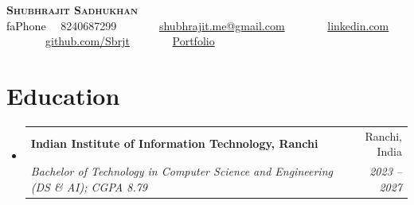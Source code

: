 \documentclass[letterpaper,11pt]{article}
\makeatletter
\newcommand{\resumeSubheading}[4]{
  \vspace{-2pt}\item
    \begin{tabular*}{0.97\textwidth}[t]{l@{\extracolsep{\fill}}r}
      \textbf{#1} & #2 \\
      \textit{\small#3} & \textit{\small #4} \\
    \end{tabular*}\vspace{-7pt}
}
\newcommand{\resumeSubHeadingListStart}{\begin{itemize}[leftmargin=0.15in, label={}]}
\newcommand{\resumeSubHeadingListEnd}{\end{itemize}}
\newcommand{\seticon}[1]{\textcolor{Black}{\csname #1\endcsname}}
\makeatother
\begin{document}

\begin{center}
    \textbf{\Huge \scshape Shubhrajit Sadhukhan} \\ \vspace{8pt}
    \footnotesize  \seticon{faPhone} \ \ 8240687299 \ \ \ \ \ \faEnvelope \ \  \href{mailto:shubhrajit.me@gmail.com}{shubhrajit.me@gmail.com} \ \ \ \ \ 
    \faLinkedin \ \ \href{https://linkedin.com/in/shubhrajit-sadhukhan}{linkedin.com} \ \ \ \ \ 
    \faGithub \ \ \href{https://github.com/Sbrjt}{github.com/Sbrjt} 	\ \ \ \ \ 
    \faLink \ \ \href{https://sbrjt.github.io/}{Portfolio}
\end{center}

\section{Education}
  \resumeSubHeadingListStart
    \resumeSubheading
      {Indian Institute of Information Technology, Ranchi}{Ranchi, India}
      {Bachelor of Technology in Computer Science and Engineering (DS \& AI); CGPA 8.79}{2023 -- 2027}
  \resumeSubHeadingListEnd

\end{document}
